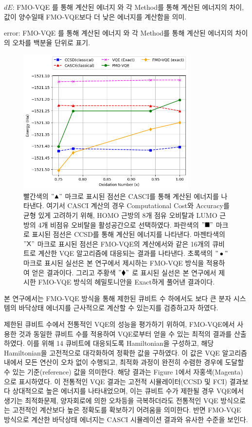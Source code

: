 \documentclass[pdflatex,sn-mathphys-num]{sn-jnl}%
\theoremstyle{thmstyleone}%
\theoremstyle{thmstyletwo}%
\theoremstyle{thmstylethree}%
\begin{document}
\begin{table}
$dE$\footnotemark[1] : {FMO-VQE 를 통해 계산된 에너지 와 각 Method를 통해 계산된 에너지의 차이, 값이 양수일때 FMO-VQE보다 더 낮은 에너지를 계산함을 의미.}

error\footnotemark[2] : {FMO-VQE 를 통해 계산된 에너지 와 각 Method를 통해 계산된 에너지의 차이의 오차를 백분율 단위로 표기.}

\end{table}

\begin{figure}[htbp]
\centering
\includegraphics[width=0.8\textwidth]{fig/result2.png}
\caption{빨간색의 $"\blacktriangle"$ 마크로 표시된 점선은 CASCI를 통해 계산된 에너지를 나타낸다. 여기서 CASCI 계산의 경우 Computational Cost와 Accuracy를 균형 있게 고려하기 위해, HOMO 근방의 8개 점유 오비탈과 LUMO 근방의 4개 비점유 오비탈을 활성공간으로 선택하였다. 
파란색의 $"\blacksquare"$ 마크로 표시된 점선은 CCSD를 통해 계산된 에너지를 나타낸다. 
마젠타색의 $"\mathsf{X} "$ 마크로 표시된 점선은 FMO-VQE의 계산에서와 같은 16개의 큐비트로 계산한 VQE 알고리즘에 대응되는 결과를 나타낸다.
초록색의 $"\bullet  "$ 마크로 표시된 실선은 본 연구에서 제시하는 FMO-VQE 방식을 적용하여 얻은 결과이다. 
그리고 주황색 $"\blacklozenge "$ 로 표시된 실선은 본 연구에서 제시한 FMO-VQE 방식의 헤밀토니안을 Exact하게 풀어낸 결과이다.}\label{Fig.5}
\end{figure}

본 연구에서는 FMO-VQE 방식을 통해 제한된 큐비트 수 하에서도 보다 큰 분자 시스템의 바닥상태 에너지를 근사적으로 계산할 수 있는지를 검증하고자 하였다. 

제한된 큐비트 수에서 전통적인 VQE의 성능을 평가하기 위하여, FMO-VQE에서 사용한 것과 동일한 큐비트 수를 적용하여 VQE로부터 얻을 수 있는 최적의 결과를 산출하였다. 이를 위해 14 큐비트에 대응되도록 Hamiltonian을 구성하고, 해당 Hamiltonian을 고전적으로 대각화하여 정확한 값을 구하였다. 이 값은 VQE 알고리즘 내에서 모든 연산이 오차 없이 수행되고, 최적화 과정이 완전히 수렴한 경우에 도달할 수 있는 기준(reference) 값을 의미한다. 해당 결과는 Figure 1에서 자홍색(Magenta)으로 표시하였다. 이 전통적인 VQE 결과는 고전적 시뮬레이터(CCSD 및 FCI) 결과보다 상대적으로 높은 에너지를 나타내었으며, 이는 큐비트 수가 제한될 경우 VQE에서 생기는 최적화문제, 양자회로에 의한 오차등을 극복하더라도 전통적인 VQE 방식으로는 고전적인 계산보다 높은 정확도를 확보하기 어려움을 의미한다. 반면 FMO-VQE 방식으로 계산한 바닥상태 에너지는 CASCI 시뮬레이션 결과와 유사한 수준을 보인다. 
\end{document}

